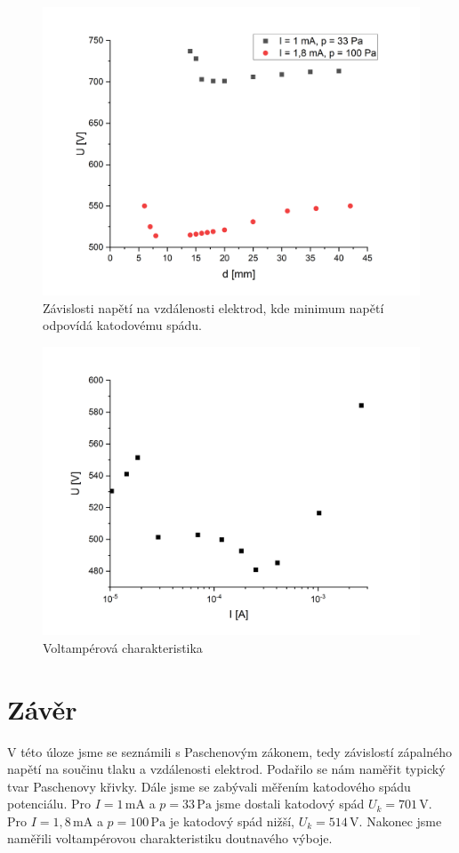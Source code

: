 \documentclass[a4paper,12pt]{article}
\begin{document}

\begin{figure}[h!]
	\centering
	\includegraphics[width=120mm]{KatodovySpad.png}
	\caption{Závislosti napětí na vzdálenosti elektrod, kde minimum napětí odpovídá katodovému spádu.}
	\label{KatodovySpad}
\end{figure}

\begin{figure}[h!]
	\centering
	\includegraphics[width=120mm]{VAodpor.png}
	\caption{Voltampérová charakteristika}
	\label{VAodpor}
\end{figure}

\newpage
\section{Závěr}
V této úloze jsme se seznámili s Paschenovým zákonem, tedy závislostí zápalného napětí na součinu tlaku a vzdálenosti elektrod. Podařilo se nám naměřit typický tvar Paschenovy křivky. Dále jsme se zabývali měřením katodového spádu potenciálu. Pro $I = 1\,\si{\milli\ampere}$ a $p = 33\,\si{\pascal}$ jsme dostali katodový spád $U_k = 701\,\si{\volt}$. Pro $I = 1,8\,\si{\milli\ampere}$ a $p = 100\,\si{\pascal}$ je katodový spád nižší,  $U_k = 514\,\si{\volt}$. Nakonec jsme naměřili voltampérovou charakteristiku doutnavého výboje.
\end{document}
